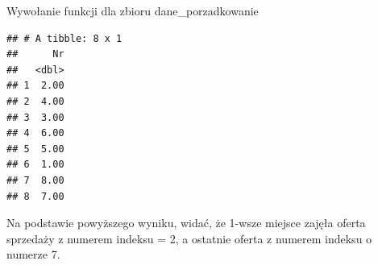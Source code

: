 \documentclass[12pt,a4paper]{report}
\begin{document}
{Wywołanie funkcji dla zbioru dane\_porzadkowanie 

\begin{Shaded}
\begin{Highlighting}[]
\end{Highlighting}
\end{Shaded}

\begin{verbatim}
## # A tibble: 8 x 1
##      Nr
##   <dbl>
## 1  2.00
## 2  4.00
## 3  3.00
## 4  6.00
## 5  5.00
## 6  1.00
## 7  8.00
## 8  7.00
\end{verbatim}

Na podstawie powyższego wyniku, widać, że 1-wsze miejsce zajęła oferta
sprzedaży z numerem indeksu = 2, a ostatnie oferta z numerem indeksu o
numerze 7.
}
\end{document}
